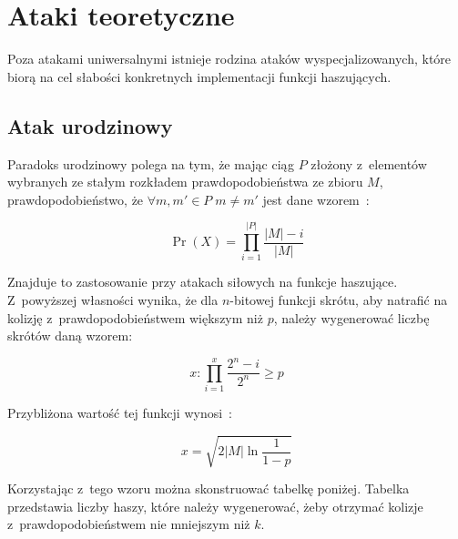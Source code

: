 \section{Ataki teoretyczne}
Poza atakami uniwersalnymi istnieje rodzina ataków wyspecjalizowanych, które
biorą na cel słabości konkretnych implementacji funkcji haszujących.

\subsection{Atak urodzinowy}
Paradoks urodzinowy polega na tym, że mając ciąg $P$ złożony z~elementów
wybranych ze stałym rozkładem prawdopodobieństwa ze zbioru $M$,
prawdopodobieństwo, że $\forall m, m' \in P \; m \neq m'$ jest dane
wzorem~\cite{birthday}:

$$ \Pr(X) = \prod_{i=1}^{|P|} \frac{|M|-i}{|M|} $$

Znajduje to zastosowanie przy atakach siłowych na funkcje haszujące.
Z~powyższej własności wynika, że dla $n$-bitowej funkcji skrótu, aby natrafić
na kolizję z~prawdopodobieństwem większym niż $p$, należy wygenerować
liczbę skrótów daną wzorem:

$$ x : \prod_{i=1}^{x} \frac{2^n-i}{2^n} \geq p $$



Przybliżona wartość tej funkcji wynosi~\cite{birthday2}:

$$ x = \sqrt{2 |M| \ln{\frac{1}{1-p}}} $$

Korzystając z~tego wzoru można skonstruować tabelkę poniżej. Tabelka
przedstawia liczby haszy, które należy wygenerować, żeby otrzymać kolizje
z~prawdopodobieństwem nie mniejszym niż $k$.

